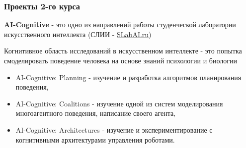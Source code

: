 \documentclass[default]{beamer}
\begin{document}
	\begin{frame}
		\frametitle{Проекты 2-го курса}
		
		\textbf{AI-Cognitive} - это одно из направлений работы студенческой лаборатории искусственного интеллекта (СЛИИ - \url{SLabAI.ru})
		
		\par\bigskip
		
		Когнитивное область исследований в искусственном интеллекте - это попытка смоделировать поведение человека на основе знаний психологии и биологии
		
		\begin{itemize}
			\item AI-Cognitive: Planning - изучение и разработка алгоритмов планирования поведения,
			\item AI-Cognitive: Coalitions - изучение одной из систем моделирования многоагентного поведения, написание своего агента,
			\item AI-Cognitive: Architectures - изучение и экспериментирование с когнитивными архитектурами управления роботами.
		\end{itemize}
	\end{frame}
	
\end{document}
